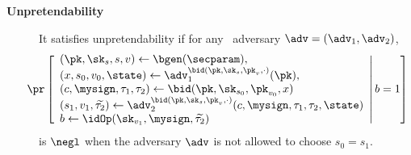 \begin{description}
	\item[\textbf{Unpretendability}]
	  It satisfies unpretendability if for any \ppt ~adversary $\adv=(\adv_1,\adv_2)$,
	  \begin{equation*}
	  	\hspace*{-.55cm}
	  	\pr\left[\begin{array}{l}
	      (\pk,\sk_s,s,v) \gets \bgen(\secparam),\\
	      (x,s_0, v_0, \state) \gets \adv_1^{\bid(\pk,\sk_s,\pk_v,\cdot)}(\pk),\\
	      (c, \mysign, \tau_1,\tau_2) \gets \bid(\pk,\sk_{s_0},\pk_{v_0},x)\\
	      (s_1,v_1,\widetilde{\tau_2}) \gets \adv_2^{\bid(\pk,\sk_s,\pk_v,\cdot)}(c,\mysign,\tau_1,\tau_2,\state)\\
	      b \gets \idOp(\sk_{v_1},\mysign,\widetilde{\tau_2})
	    \end{array}\middle\vert\,  b=1 \right]
	  \end{equation*}
	  is $\negl$ when the adversary $\adv$ is not allowed to choose $s_0=s_1$.
\end{description}
